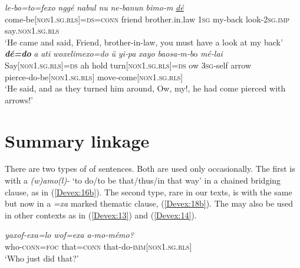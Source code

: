 \documentclass[output=paper]{LSP/langsci}
\begin{document}
\begin{exe}
\ex \label{Devex:12ab}
\begin{xlist}
\ex \label{Devex:12a}		
\gll \textit{le‑bo=to=fexo} \textit{nggé} \textit{nabul} \textit{nu} \textit{ne‑banun} \textit{bimo‑m} \underline{\textit{dé}}\\
come‑be[\textsc{non1.sg.rls}]=\textsc{ds}=\textsc{conn} friend brother.in.law \textsc{1sg} my‑back look‑\textsc{2sg.imp} say.\textsc{non1.sg.rls} \\
\glt `He came and said, Friend, brother-in-law, you must have a look at my back'\\

\ex \label{Devex:12b}		
\gll \textbf{\textit{dé=do}} \textit{a} \textit{ati} \textit{woxelimexo=do} \textit{ü} \textit{yi‑pa} \textit{xayo} \textit{baosa‑m‑b}o \textit{mé‑lai}\\          
Say[\textsc{non1.sg.rls}]=\textsc{ds} ah hold turn[\textsc{non1.sg.rls}]=\textsc{ds} ow \textsc{3sg}‑self  	arrow pierce‑do‑be[\textsc{non1.sg.rls}] move‑come[\textsc{non1.sg.rls}]\\
\glt `He said, and as they turned him around, Ow, my!, he had come pierced with arrows!'\\
\end{xlist}
\end{exe}

	
\section{Summary linkage} 
\label{Devsumm.link}
There are two types of  of sentences. Both are used only occasionally. The first is with a  \textit{(w)amo(l)-} `to do/to be that/thus/in that way' in a chained bridging clause, as in (\ref{Devex:16b}). The second type, rare in our texts, is with the same  but now in a \textit{=xa} marked thematic clause, (\ref{Devex:18b}). The  may also be used in other contexts as in (\ref{Devex:13}) and (\ref{Devex:14}).


\begin{exe}
\ex \label{Devex:13}
\gll \textit{yaxof-exa=lo} \textit{wof=exa} \textit{a-mo-mémo?}\\
who-\textsc{conn=foc} that=\textsc{conn} that-do-\textsc{imm[non1.sg.rls]}\\
\glt `Who just did that?'\\
\end{exe}
	     
\end{document}
